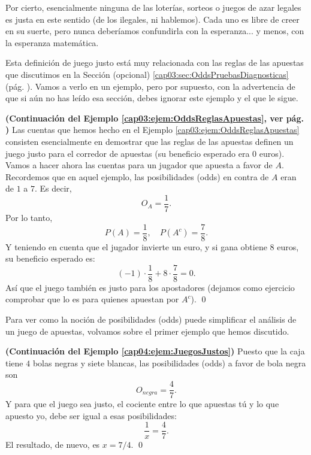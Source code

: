 Por cierto, esencialmente ninguna de las loterías, sorteos o juegos de azar legales es justa en este sentido (de los ilegales, ni hablemos). Cada uno es libre de creer en su suerte, pero nunca deberíamos confundirla con la esperanza... y menos, con la esperanza matemática.

Esta definición de juego justo está muy relacionada con las reglas de las apuestas que discutimos en la Sección (opcional) \ref{cap03:sec:OddsPruebasDiagnosticas} (pág. \pageref{cap03:sec:OddsPruebasDiagnosticas}). Vamos a verlo en un ejemplo, pero por supuesto, con la advertencia de que si aún no has leído esa sección, debes ignorar este ejemplo y el que le sigue.
\begin{ejemplo}\label{cap04:ejem:OddsReglasApuestasJuegoJusto}
{\bf (Continuación del Ejemplo \ref{cap03:ejem:OddsReglasApuestas}, ver pág. \pageref{cap03:ejem:OddsReglasApuestas})}
Las cuentas que hemos hecho en el Ejemplo \ref{cap03:ejem:OddsReglasApuestas} consisten esencialmente en demostrar que las reglas de las apuestas definen un juego justo para el corredor de apuestas (su beneficio esperado era $0$ euros). Vamos a hacer ahora las cuentas para un jugador que apuesta a favor de $A$. Recordemos que en aquel ejemplo, las posibilidades (odds) en contra de $A$ eran de $1$ a $7$. Es decir,
\[O_A=\dfrac{1}{7}.\]
Por lo tanto,
\[P(A)=\dfrac{1}{8},\quad  P(A^c)=\dfrac{7}{8}.\]
Y teniendo en cuenta que el jugador invierte un euro, y si gana obtiene $8$ euros, su beneficio esperado es:
\[(-1)\cdot\dfrac{1}{8}+8\cdot\dfrac{7}{8}=0.\]
Así que el juego también es justo para los apostadores (dejamos como ejercicio comprobar que lo es para quienes apuestan por $A^c$).
\qed
\end{ejemplo}
Para ver como la noción de posibilidades (odds) puede simplificar el análisis de un juego de apuestas, volvamos sobre el primer ejemplo que hemos discutido.
\begin{ejemplo}
\label{cap04:ejem:JuegosJustos01}
{\bf (Continuación del Ejemplo \ref{cap04:ejem:JuegosJustos})}
Puesto que la caja tiene $4$ bolas negras y siete blancas, las posibilidades (odds) a favor de bola negra son
\[O_{negra}=\dfrac{4}{7}.\]
Y para que el juego sea justo, el cociente entre lo que apuestas tú y lo que apuesto yo, debe ser igual a esas posibilidades:
\[\dfrac{1}{x}=\dfrac{4}{7}.\]
El resultado, de nuevo, es $x=7/4$.
\qed
\end{ejemplo}



